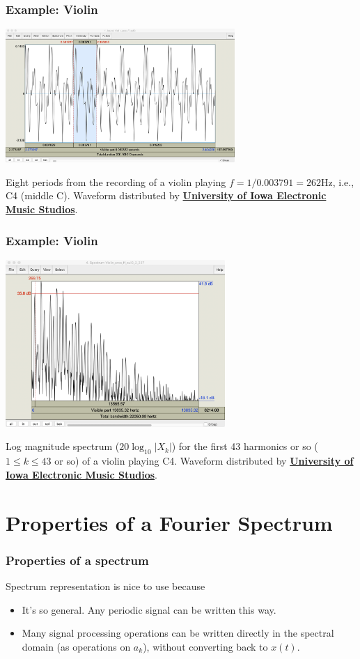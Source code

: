 \documentclass{beamer}
\begin{document}
\begin{frame}
  \frametitle{Example: Violin}

  \centerline{\includegraphics[height=2in]{violin_waveform.png}}
    Eight periods from the recording of a violin playing $f=1/0.003791=262$Hz, i.e., C4 (middle C).
    Waveform distributed by
    \href{http://theremin.music.uiowa.edu/MIS.html}{\bf\color{blue}University of Iowa Electronic Music Studios}.
\end{frame}

\begin{frame}
  \frametitle{Example: Violin}

  \centerline{\includegraphics[height=2.5in]{violin_spectrum.png}}
    Log magnitude spectrum ($20\log_{10}|X_k|$) for the first 43 harmonics or so
    ($1\le k\le 43$ or so) of a violin playing C4.
    Waveform distributed by
    \href{http://theremin.music.uiowa.edu/MIS.html}{\bf\color{blue}University of Iowa Electronic Music Studios}.
\end{frame}

\section[Properties]{Properties of a Fourier Spectrum}
\setcounter{subsection}{1}

\begin{frame}
  \frametitle{Properties of a spectrum}

  Spectrum representation is nice to use because
  \begin{itemize}
  \item It's so general.  Any periodic signal can be written this way.
  \item Many signal processing operations can be written directly in
    the spectral domain (as operations on $a_k$), without converting
    back to $x(t)$.
  \end{itemize}
\end{frame}
\end{document}
